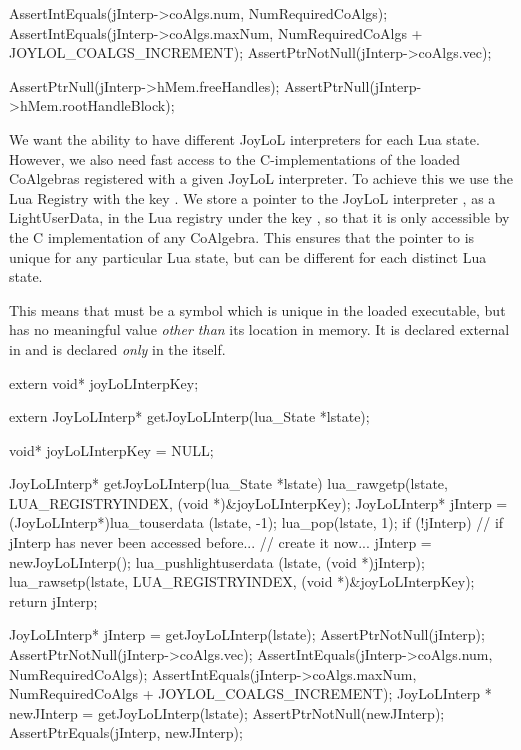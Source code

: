   AssertIntEquals(jInterp->coAlgs.num,
    NumRequiredCoAlgs);
  AssertIntEquals(jInterp->coAlgs.maxNum,
    NumRequiredCoAlgs + JOYLOL_COALGS_INCREMENT);
  AssertPtrNotNull(jInterp->coAlgs.vec);
  
  AssertPtrNull(jInterp->hMem.freeHandles);
  AssertPtrNull(jInterp->hMem.rootHandleBlock);
\stopCTest
\stopTestCase
\stopTestSuite


We want the ability to have different JoyLoL interpreters for each Lua 
state. However, we also need fast access to the C-implementations of the 
loaded CoAlgebras registered with a given JoyLoL interpreter. To achieve 
this we use the Lua Registry with the  key 
. We store a pointer to the JoyLoL interpreter 
, as a LightUserData, in the Lua registry under the key 
, so that it is only accessible by the C 
implementation of any CoAlgebra. This ensures that the pointer to 
 is unique for any particular Lua state, but can be 
different for each distinct Lua state. 

This means that  must be a symbol which is unique in 
the loaded executable, but has no meaningful value \emph{other than} its 
location in memory. It is declared external in  and is 
declared \emph{only} in the  itself. 

\startCHeader
extern void* joyLoLInterpKey;

extern JoyLoLInterp* getJoyLoLInterp(lua_State *lstate);
\stopCHeader

\startCCode
void* joyLoLInterpKey = NULL;

JoyLoLInterp* getJoyLoLInterp(lua_State *lstate) {
  lua_rawgetp(lstate, LUA_REGISTRYINDEX, (void *)&joyLoLInterpKey);
  JoyLoLInterp* jInterp = (JoyLoLInterp*)lua_touserdata (lstate, -1);
  lua_pop(lstate, 1);
  if (!jInterp) {
    // if jInterp has never been accessed before... 
    // create it now...
    jInterp = newJoyLoLInterp();
    lua_pushlightuserdata (lstate, (void *)jInterp);
    lua_rawsetp(lstate, LUA_REGISTRYINDEX, (void *)&joyLoLInterpKey);
  }
  return jInterp;
}
\stopCCode


\startCTest
  JoyLoLInterp* jInterp = getJoyLoLInterp(lstate);
  AssertPtrNotNull(jInterp);
  AssertPtrNotNull(jInterp->coAlgs.vec);
  AssertIntEquals(jInterp->coAlgs.num, NumRequiredCoAlgs);
  AssertIntEquals(jInterp->coAlgs.maxNum,
    NumRequiredCoAlgs + JOYLOL_COALGS_INCREMENT);
  JoyLoLInterp * newJInterp = getJoyLoLInterp(lstate);
  AssertPtrNotNull(newJInterp);
  AssertPtrEquals(jInterp, newJInterp);
\stopCTest
\stopTestCase
\stopTestSuite


